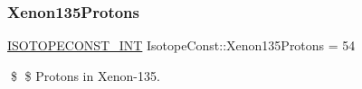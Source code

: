 \subsubsection{\texorpdfstring{Xenon135\+Protons}{Xenon135Protons}}
{\footnotesize\ttfamily \mbox{\hyperlink{group___isotope_const-_macros_ga5f18360b3e99483a35c32d789e62621c}{I\+S\+O\+T\+O\+P\+E\+C\+O\+N\+S\+T\+\_\+\+I\+NT}} Isotope\+Const\+::\+Xenon135\+Protons = 54}

\$ \$ Protons in Xenon-\/135. 